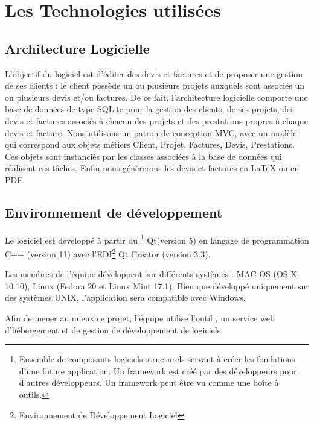 \section{Les Technologies utilisées}
\subsection{Architecture Logicielle}
L’objectif du logiciel est d’éditer des devis et factures et de proposer une gestion de ses clients : le client possède un ou plusieurs projets auxquels sont associés un ou plusieurs devis et/ou factures. 
De ce fait, l’architecture logicielle comporte une base de données de type SQLite pour la gestion des clients, de ses projets, des devis et factures associés à chacun des projets et des prestations propres à chaque devis et facture. 
Nous utilisons un patron de conception MVC, avec un modèle qui correspond aux objets métiers Client, Projet, Factures, Devis, Prestations. Ces objets sont instanciés par les classes associées à la base de données qui réalisent ces tâches.
Enfin nous générerons les devis et factures en LaTeX ou en PDF.

\subsection{Environnement de développement}
Le logiciel est développé à partir du 
\footnote{Ensemble de composants logiciels structurels servant à créer les fondations d'une future application. Un framework est créé par des développeurs pour d'autres développeurs. Un framework peut être vu comme une boîte à outils.} 
Qt(version 5)
en langage de programmation C++ (version 11) avec l'EDI\footnote{Environnement de Développement Logiciel} Qt Creator (version 3.3). 

Les membres de l’équipe développent sur différents systèmes : MAC OS (OS X 10.10), Linux (Fedora 20 et Linux Mint 17.1). Bien que développé uniquement sur des systèmes UNIX, l’application sera compatible avec Windows. 

Afin de mener au mieux ce projet, l'équipe utilise l'outil , un service web d’hébergement et de gestion de développement de logiciels. 

